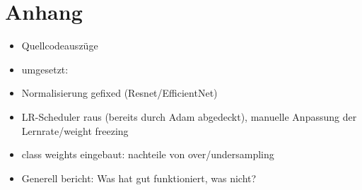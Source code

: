 \documentclass{article}
\begin{document}
    
    

    \section*{Anhang}
    \begin{itemize}
        \item Quellcodeauszüge
        \item umgesetzt:
        \item Normalisierung gefixed (Resnet/EfficientNet)
        \item LR-Scheduler raus (bereits durch Adam abgedeckt), manuelle Anpassung der Lernrate/weight freezing
        \item class weights eingebaut: nachteile von over/undersampling
        \item Generell bericht: Was hat gut funktioniert, was nicht?
    \end{itemize}
\end{document}

